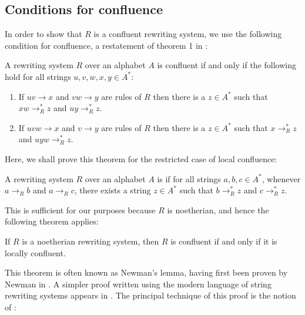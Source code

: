 \documentclass[libertine,widepage,nosubthm]{lmaths}
\begin{document}
\subsection{Conditions for confluence}

In order to show that $R$ is a confluent rewriting system, we use the following condition for confluence, a restatement of theorem 1 in \cite{McNaughton1987}:
\begin{theorem}
	A rewriting system $R$ over an alphabet $A$ is confluent if and only if the following hold for all strings $u, v, w, x, y \in A^*$:
	\begin{enumerate}[(1)]
		\item \label{it:conf-overlap} If $uv \to x$ and $vw \to y$ are rules of $R$ then there is a $z \in A^*$ such that $xw \to^*_R z$ and $uy \to^*_R z$.
		\item \label{it:conf-middle} If $uvw \to x$ and $v \to y$ are rules of $R$ then there is a $z \in A^*$ such that $x \to^*_R z$ and $uyw \to^*_R z$.
	\end{enumerate}
\end{theorem}

Here, we shall prove this theorem for the restricted case of local confluence:

\begin{defn}
	A rewriting system $R$ over an alphabet $A$ is  if for all strings $a, b, c \in A^*$, whenever $a \to_R b$ and $a \to_R c$, there exists a string $z \in A^*$ such that $b \to^*_R z$ and $c \to^*_R z$.
\end{defn}

This is sufficient for our purposes because $R$ is noetherian, and hence the following theorem applies:

\begin{theorem}[Newman] \label{thm:newman}
	If $R$ is a noetherian rewriting system, then $R$ is confluent if and only if it is locally confluent.
\end{theorem}

This theorem is often known as Newman's lemma, having first been proven by Newman in \cite{Newman1942}. A simpler proof written using the modern language of string rewriting systems appears in \cite{Huet1980}. The principal technique of this proof is the notion of :
\end{document}
